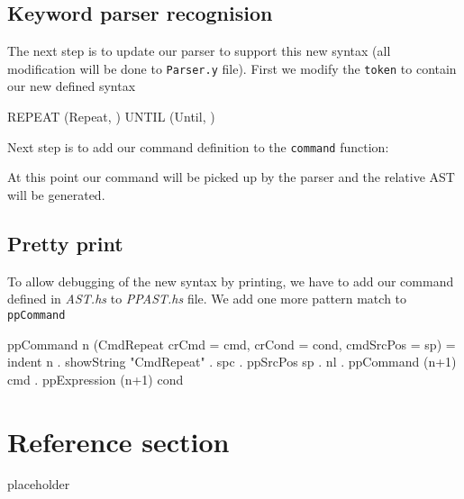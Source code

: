 \documentclass{article}
\begin{document}
\subsection{Keyword parser recognision}
\begin{flushleft}
The next step is to update our parser to support this new syntax (all modification will be done to \texttt{Parser.y} file). First we modify the \texttt{token} to contain our new defined syntax
\end{flushleft}
\begin{code}
REPEAT      { (Repeat, $$) }
UNTIL       { (Until, $$) }
\end{code}
\begin{flushleft}
Next step is to add our command definition to the \texttt{command} function:
\end{flushleft}
\begin{flushleft}
At this point our command will be picked up by the parser and the relative AST will be generated.
\end{flushleft}

\subsection{Pretty print}
\begin{flushleft}
To allow debugging of the new syntax by printing, we have to add our command defined in \textit{AST.hs} to \textit{PPAST.hs} file. We add one more pattern match to \texttt{ppCommand}
\end{flushleft}
\begin{code}
ppCommand n (CmdRepeat {crCmd = cmd, crCond = cond, cmdSrcPos = sp}) =
    indent n . showString "CmdRepeat" . spc . ppSrcPos sp . nl
    . ppCommand (n+1) cmd 
    . ppExpression (n+1) cond
\end{code}

\pagebreak
\section*{Reference section} \label{sec:reference}
\begin{description}
	\item[placeholder] \hfill \\
\end{description}
\end{document}
